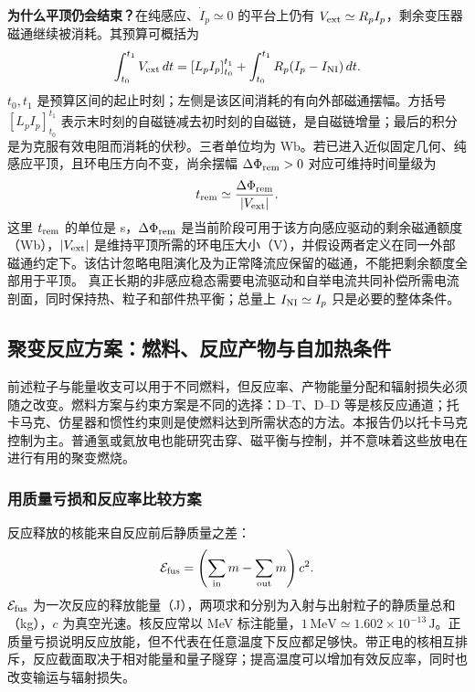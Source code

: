 \documentclass[12pt,fontset=none]{ctexart}
\numberwithin{equation}{section}
\numberwithin{table}{section}
\numberwithin{figure}{section}
\begin{document}
\textbf{为什么平顶仍会结束？}在纯感应、$\dot I_p\simeq0$ 的平台上仍有 $V_{\rm ext}\simeq R_pI_p$，剩余变压器磁通继续被消耗。其预算可概括为
\begin{equation}\label{eq:cycle-fluxbudget}
 \int_{t_0}^{t_1}V_{\rm ext}\,dt
 =\left[L_pI_p\right]_{t_0}^{t_1}
 +\int_{t_0}^{t_1}R_p(I_p-I_{\rm NI})\,dt.
\end{equation}
$t_0,t_1$ 是预算区间的起止时刻；左侧是该区间消耗的有向外部磁通摆幅。方括号 $[L_pI_p]_{t_0}^{t_1}$ 表示末时刻的自磁链减去初时刻的自磁链，是自磁链增量；最后的积分是为克服有效电阻而消耗的伏秒。三者单位均为 Wb。若已进入近似固定几何、纯感应平顶，且环电压方向不变，尚余摆幅 $\Delta\Phi_{\rm rem}>0$ 对应可维持时间量级为
\begin{equation}\label{eq:cycle-remainingflux}
 t_{\rm rem}\simeq\frac{\Delta\Phi_{\rm rem}}{|V_{\rm ext}|}.
\end{equation}
这里 $t_{\rm rem}$ 的单位是 s，$\Delta\Phi_{\rm rem}$ 是当前阶段可用于该方向感应驱动的剩余磁通额度（Wb），$|V_{\rm ext}|$ 是维持平顶所需的环电压大小（V），并假设两者定义在同一外部磁通约定下。该估计忽略电阻演化及为正常降流应保留的磁通，不能把剩余额度全部用于平顶。
真正长期的非感应稳态需要电流驱动和自举电流共同补偿所需电流剖面，同时保持热、粒子和部件热平衡；总量上 $I_{\rm NI}\simeq I_p$ 只是必要的整体条件。

\subsection{聚变反应方案：燃料、反应产物与自加热条件}\label{sec:cycle-fuels}

前述粒子与能量收支可以用于不同燃料，但反应率、产物能量分配和辐射损失必须随之改变。燃料方案与约束方案是不同的选择：D--T、D--D 等是核反应通道；托卡马克、仿星器和惯性约束则是使燃料达到所需状态的方法。本报告仍以托卡马克控制为主。普通氢或氦放电也能研究击穿、磁平衡与控制，并不意味着这些放电在进行有用的聚变燃烧。

\subsubsection{用质量亏损和反应率比较方案}

反应释放的核能来自反应前后静质量之差：
\begin{equation}\label{eq:cycle-massdefect}
 \mathcal E_{\rm fus}=\left(\sum_{\rm in}m-\sum_{\rm out}m\right)c^2.
\end{equation}
$\mathcal E_{\rm fus}$ 为一次反应的释放能量（J），两项求和分别为入射与出射粒子的静质量总和（kg），$c$ 为真空光速。核反应常以 MeV 标注能量，$1\,\mathrm{MeV}\simeq1.602\times10^{-13}\,\mathrm J$。正质量亏损说明反应放能，但不代表在任意温度下反应都足够快。带正电的核相互排斥，反应截面取决于相对能量和量子隧穿；提高温度可以增加有效反应率，同时也改变输运与辐射损失。
\end{document}
